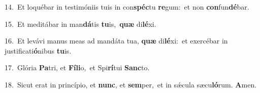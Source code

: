 {\numbfont\textcolor{\numbcolor}{14.}}~Et loquébar in testimóniis tuis in con\-\textbf{spéc}\-tu \textbf{re}\-gum:~\star et non \textbf{con}\-fun\-\textbf{dé}\-bar.\par
{\numbfont\textcolor{\numbcolor}{15.}}~Et meditábar in man\-\textbf{dá}\-tis \textbf{tu}\-is,~\star \textbf{quæ} di\-\textbf{lé}\-xi.\par
{\numbfont\textcolor{\numbcolor}{16.}}~Et levávi manus meas ad mandáta tua, \textbf{quæ} di\-\textbf{lé}\-xi:~\star et exercébar in justificati\-\textbf{ó}\-nibus \textbf{tu}\-is.\par
{\numbfont\textcolor{\numbcolor}{17.}}~Glória \textbf{Pa}\-tri, et \textbf{Fí}\-\textbf{li}o,~\star et Spi\-\textbf{rí}\-tui \textbf{Sanc}\-to.\par
{\numbfont\textcolor{\numbcolor}{18.}}~Sicut erat in princípio, et \textbf{nunc}\-, et \textbf{sem}\-per,~\star et in sǽcula sæcu\-\textbf{ló}\-rum. \textbf{A}\-men.\par
